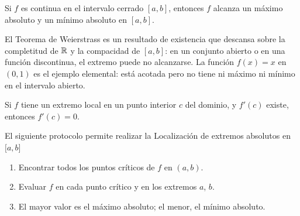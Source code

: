 \begin{theorem}
Si $f$ es continua en el intervalo cerrado $[a,b]$, entonces $f$ alcanza
un máximo absoluto y un mínimo absoluto en $[a,b]$.
\end{theorem}

\begin{rem}
El Teorema de Weierstrass es un resultado de existencia que descansa
sobre la completitud de ${\mathbb R}$ y la compacidad de $[a,b]$: en un conjunto
abierto o en una función discontinua, el extremo puede no alcanzarse.
La función $f(x)=x$ en $(0,1)$ es el ejemplo elemental: está acotada
pero no tiene ni máximo ni mínimo en el intervalo abierto.
\end{rem}

\begin{theorem}[Fermat]
Si $f$ tiene un extremo local en un punto interior $c$ del dominio, y
$f'(c)$ existe, entonces $f'(c)=0$.
\end{theorem}

\begin{pasos} El siguiente protocolo permite realizar la Localización de extremos absolutos en $\lbrack a,b\rbrack$
\begin{enumerate}
    \item Encontrar todos los puntos críticos de $f$ en $(a,b)$.
    \item Evaluar $f$ en cada punto crítico y en los extremos $a$, $b$.
    \item El mayor valor es el máximo absoluto; el menor, el mínimo
    absoluto.
\end{enumerate}
\end{pasos}

